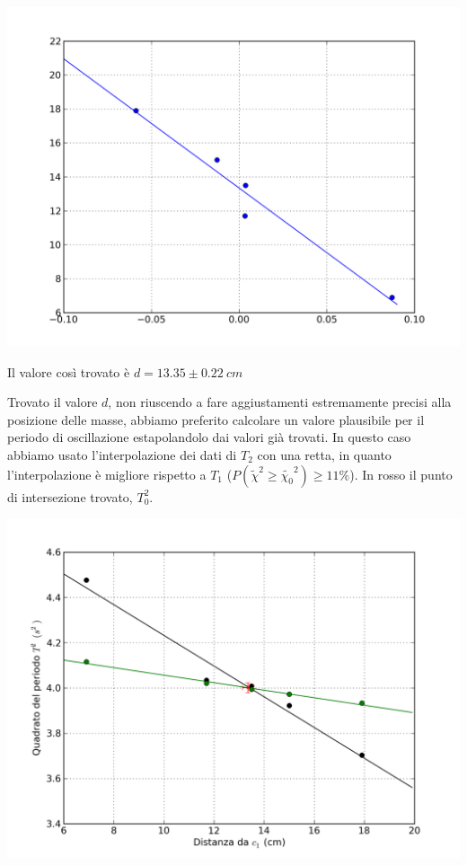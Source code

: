 \begin{center}
\includegraphics[scale=0.60]{../grafici/kater/intercetta.png}
\end{center}
Il valore così trovato è $d = 13.35 \pm 0.22\ cm$

Trovato il valore $d$, non riuscendo a fare aggiustamenti estremamente precisi alla posizione delle masse, abbiamo preferito calcolare un valore plausibile per il periodo di oscillazione estapolandolo dai valori già trovati. In questo caso abbiamo usato l'interpolazione dei dati di $T_2$ con una retta, in quanto l'interpolazione è migliore rispetto a $T_1$ ($P(\tilde{\chi}^2 \geq \tilde{\chi_0}^2) \geq 11\%$).
In rosso il punto di intersezione trovato, $T^2_0$.

\begin{center}
\includegraphics[scale=0.70]{../grafici/kater/intersezione.png}
\end{center}

